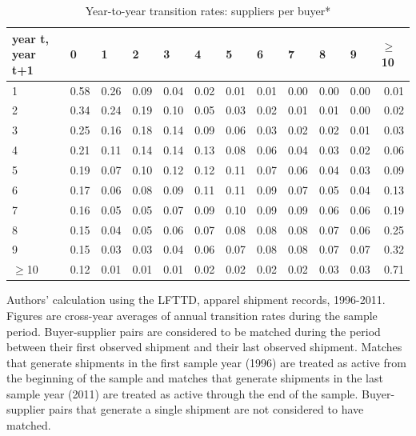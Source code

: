 \documentclass[12pt]{article} \usepackage{amsmath,amssymb,amsthm,geometry,graphicx,setspace,algorithm,algpseudocode,float}
\begin{document}
\begin{table}[htbp]
\caption{Year-to-year transition rates: suppliers per buyer*}
\label{tab:sellers_per_buyer_transitions}\centering
\begin{small}
\begin{tabular}{lrrrrrrrrrrr}
\toprule
year t, year t+1 & \multicolumn{1}{l}{0} & \multicolumn{1}{l}{1} & \multicolumn{1}{l}{2} & \multicolumn{1}{l}{3} & \multicolumn{1}{l}{4} & \multicolumn{1}{l}{5} & \multicolumn{1}{l}{6} & \multicolumn{1}{l}{7} & \multicolumn{1}{l}{8} & \multicolumn{1}{l}{9} & \multicolumn{1}{l}{$\geq $10 } \\ \midrule 
1 & 0.58 & 0.26 & 0.09 & 0.04 & 0.02 & 0.01 & 0.01 & 0.00 & 0.00 & 0.00 & 
0.01 \\ 
2 & 0.34 & 0.24 & 0.19 & 0.10 & 0.05 & 0.03 & 0.02 & 0.01 & 0.01 & 0.00 & 
0.02 \\ 
3 & 0.25 & 0.16 & 0.18 & 0.14 & 0.09 & 0.06 & 0.03 & 0.02 & 0.02 & 0.01 & 
0.03 \\ 
4 & 0.21 & 0.11 & 0.14 & 0.14 & 0.13 & 0.08 & 0.06 & 0.04 & 0.03 & 0.02 & 
0.06 \\ 
5 & 0.19 & 0.07 & 0.10 & 0.12 & 0.12 & 0.11 & 0.07 & 0.06 & 0.04 & 0.03 & 
0.09 \\ 
6 & 0.17 & 0.06 & 0.08 & 0.09 & 0.11 & 0.11 & 0.09 & 0.07 & 0.05 & 0.04 & 
0.13 \\ 
7 & 0.16 & 0.05 & 0.05 & 0.07 & 0.09 & 0.10 & 0.09 & 0.09 & 0.06 & 0.06 & 
0.19 \\ 
8 & 0.15 & 0.04 & 0.05 & 0.06 & 0.07 & 0.08 & 0.08 & 0.08 & 0.07 & 0.06 & 
0.25 \\ 
9 & 0.15 & 0.03 & 0.03 & 0.04 & 0.06 & 0.07 & 0.08 & 0.08 & 0.07 & 0.07 & 
0.32 \\ 
$\geq $10 & 0.12 & 0.01 & 0.01 & 0.01 & 0.02 & 0.02 & 0.02 & 0.02 & 0.03 &
0.03 & 0.71 \\
\bottomrule
\end{tabular}
\end{small}
\begin{tablenotes}\footnotesize
\item *Authors' calculation using the LFTTD, apparel shipment records, 1996-2011. Figures are cross-year averages of annual transition rates during the sample period. Buyer-supplier pairs are considered to be matched during the period between their first observed shipment and their last observed shipment. Matches that generate shipments in the first sample year (1996) are treated as active from the beginning of the sample and matches that generate shipments in the last sample year (2011) are treated as active through the end of the sample. Buyer-supplier pairs that generate a single shipment are not considered to have matched.
\end{tablenotes}
\end{table}
\end{document}

